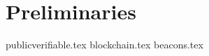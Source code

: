 \section{Preliminaries}\label{sec:preliminaries}

{publicverifiable.tex}
{blockchain.tex}
{beacons.tex}
